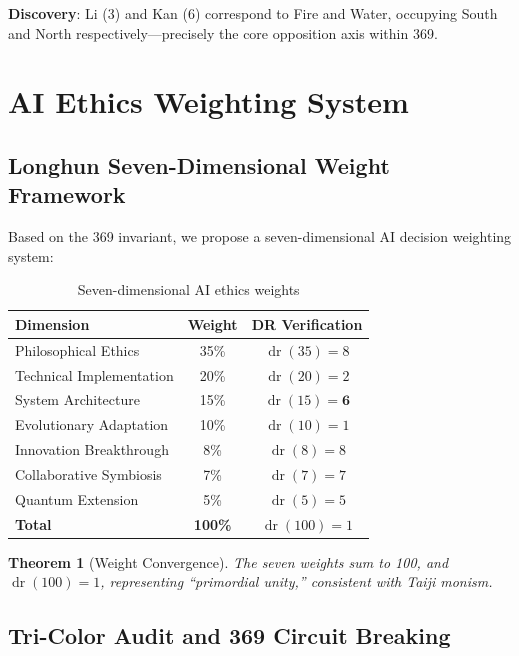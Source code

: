 \documentclass[conference]{IEEEtran}
\newtheorem{theorem}{Theorem}[section]
\theoremstyle{remark}
\newcommand{\dr}{\operatorname{dr}}
\begin{document}
\textbf{Discovery}: Li (3) and Kan (6) correspond to Fire and Water, occupying South and North respectively---precisely the core opposition axis within 369.

\section{AI Ethics Weighting System}

\subsection{Longhun Seven-Dimensional Weight Framework}

Based on the 369 invariant, we propose a seven-dimensional AI decision weighting system:

\begin{table}[h]
\centering
\caption{Seven-dimensional AI ethics weights}
\label{tab:weights}
\begin{tabular}{lcc}
\toprule
Dimension & Weight & DR Verification \\
\midrule
Philosophical Ethics & 35\% & $\dr(35)=8$ \\
Technical Implementation & 20\% & $\dr(20)=2$ \\
System Architecture & 15\% & $\dr(15)=\mathbf{6}$ \\
Evolutionary Adaptation & 10\% & $\dr(10)=1$ \\
Innovation Breakthrough & 8\% & $\dr(8)=8$ \\
Collaborative Symbiosis & 7\% & $\dr(7)=7$ \\
Quantum Extension & 5\% & $\dr(5)=5$ \\
\midrule
\textbf{Total} & \textbf{100\%} & $\dr(100)=1$ \\
\bottomrule
\end{tabular}
\end{table}

\begin{theorem}[Weight Convergence]
The seven weights sum to 100, and $\dr(100)=1$, representing ``primordial unity,'' consistent with Taiji monism.
\end{theorem}

\subsection{Tri-Color Audit and 369 Circuit Breaking}
\end{document}
